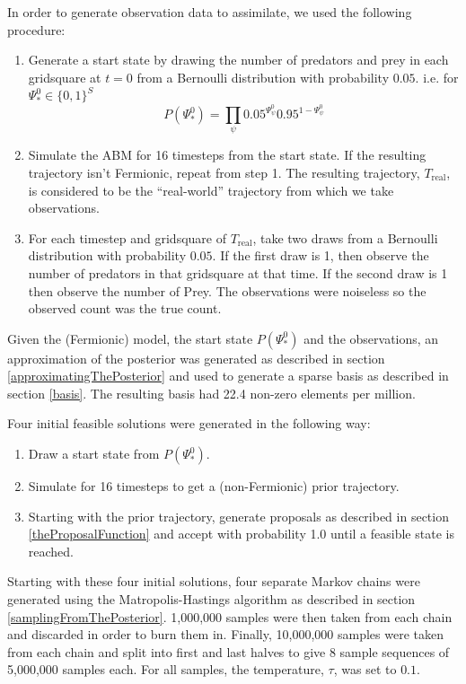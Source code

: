 \documentclass{article}
\begin{document}
In order to generate observation data to assimilate, we used the following procedure:
\begin{enumerate}
\item Generate a start state by drawing the number of predators and prey in each gridsquare at $t=0$ from a Bernoulli distribution with probability $0.05$. i.e. for $\Psi^0_* \in \{0,1\}^S$
\begin{equation}
P(\Psi^0_*) = \prod_\psi 0.05^{\Psi^0_\psi}0.95^{1-\Psi^0_\psi}
\label{bernoulliStartState}
\end{equation}

\item Simulate the ABM for 16 timesteps from the start state. If the resulting trajectory isn't Fermionic, repeat from step 1. The resulting trajectory, $T_{\text{real}}$, is considered to be the ``real-world'' trajectory from which we take observations.

\item For each timestep and gridsquare of $T_{\text{real}}$, take two draws from a Bernoulli distribution with probability $0.05$. If the first draw is 1, then observe the number of predators in that gridsquare at that time. If the second draw is 1 then observe the number of Prey. The observations were noiseless so the observed count was the true count.
\end{enumerate}

Given the (Fermionic) model, the start state $P(\Psi^0_*)$ and the observations, an approximation of the posterior was generated as described in section \ref{approximatingThePosterior} and used to generate a sparse basis as described in section \ref{basis}. The resulting basis had 22.4 non-zero elements per million.

Four initial feasible solutions were generated in the following way:
\begin{enumerate}
\item Draw a start state from $P(\Psi^0_*)$.
\item Simulate for 16 timesteps to get a (non-Fermionic) prior trajectory.
\item Starting with the prior trajectory, generate proposals as described in section \ref{theProposalFunction} and accept with probability 1.0 until a feasible state is reached.
\end{enumerate}

Starting with these four initial solutions, four separate Markov chains were generated using the Matropolis-Hastings algorithm as described in section \ref{samplingFromThePosterior}. 1,000,000 samples were then taken from each chain and discarded in order to burn them in. Finally, 10,000,000 samples were taken from each chain and split into first and last halves to give 8 sample sequences of 5,000,000 samples each. For all samples, the temperature, $\tau$, was set to $0.1$.
\end{document}
